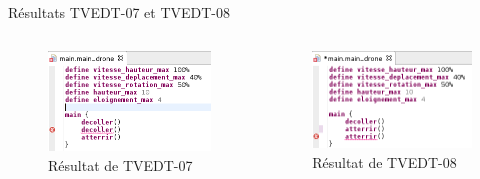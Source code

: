 \documentclass{bredelebeamer}
\begin{document}
\begin{frame}{Résultats TVEDT-07 et TVEDT-08} 
\begin{columns}
\begin{column}{0.5\textwidth}
\begin{figure}
\centering
\includegraphics[scale=0.4]{images/TVEDT-07.png}
\caption{Résultat de TVEDT-07}
\end{figure}
\end{column}
\begin{column}{0.5\textwidth}
\begin{figure}
\centering
\includegraphics[scale=0.4]{images/TVEDT-08.png}
\caption{Résultat de TVEDT-08}
\end{figure}
\end{column}
\end{columns}
\end{frame}
\end{document}
